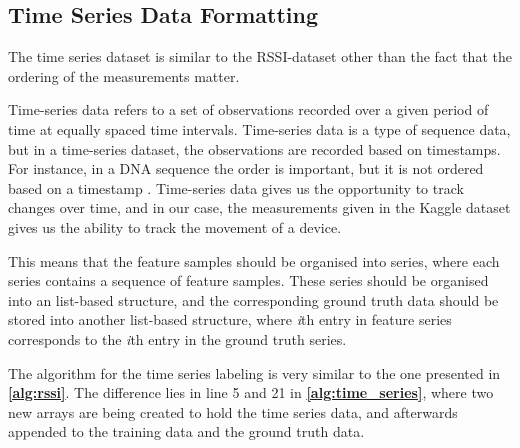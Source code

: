 
\subsection{Time Series Data Formatting}

The time series dataset is similar to the RSSI-dataset other than the fact that the ordering of the measurements matter. 

Time-series data refers to a set of observations recorded over a given period of time at equally spaced time intervals. Time-series data is a type of sequence data, but in a time-series dataset, the observations are recorded based on timestamps. For instance, in a DNA sequence the order is important, but it is not ordered based on a timestamp \cite{Yalcın2021}. Time-series data gives us the opportunity to track changes over time, and in our case, the measurements given in the Kaggle dataset gives us the ability to track the movement of a device. 

This means that the feature samples should be organised into series, where each series contains a sequence of feature samples. These series should be organised into an list-based structure, and the corresponding ground truth data should be stored into another list-based structure, where \textit{i}th entry in feature series corresponds to the \textit{i}th entry in the ground truth series.

The algorithm for the time series labeling is very similar to the one presented in \textbf{\autoref{alg:rssi}}. The difference lies in line 5 and 21 in \textbf{\autoref{alg:time_series}}, where two new arrays are being created to hold the time series data, and afterwards appended to the training data and the ground truth data.

